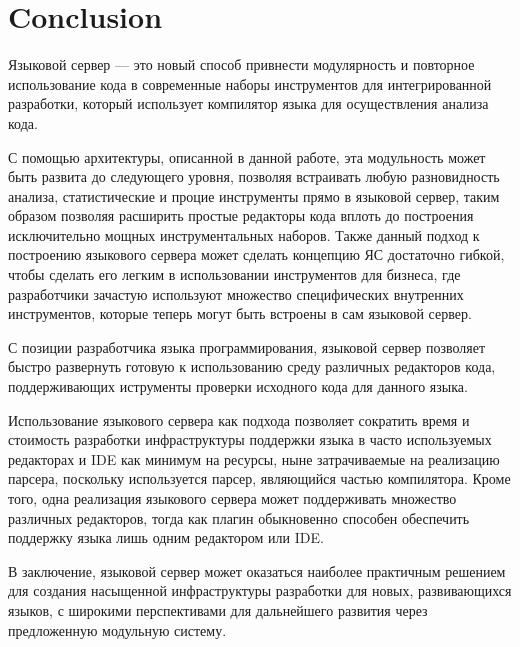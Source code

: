 \chapter{Conclusion}
\label{chap:conclusion}

Языковой сервер --- это новый способ привнести модулярность и повторное использование кода в современные наборы инструментов для интегрированной разработки, который использует компилятор языка для осуществления анализа кода.

С помощью архитектуры, описанной в данной работе, эта модульность может быть развита до следующего уровня, позволяя встраивать любую разновидность анализа, статистические и процие инструменты прямо в языковой сервер, таким образом позволяя расширить простые редакторы кода вплоть до построения исключительно мощных инструментальных наборов. Также данный подход к построению языкового сервера может сделать концепцию ЯС достаточно гибкой, чтобы сделать его легким в использовании инструментов для бизнеса, где разработчики зачастую используют множество специфических внутренних инструментов, которые теперь могут быть встроены в сам языковой сервер.

С позиции разработчика языка программирования, языковой сервер позволяет быстро развернуть готовую к использованию среду различных редакторов кода, поддерживающих иструменты проверки исходного кода для данного языка.

Использование языкового сервера как подхода позволяет сократить время и стоимость разработки инфраструктуры поддержки языка в часто используемых редакторах и IDE как минимум на ресурсы, ныне затрачиваемые на реализацию парсера, поскольку используется парсер, являющийся частью компилятора. Кроме того, одна реализация языкового сервера может поддерживать множество различных редакторов, тогда как плагин обыкновенно способен обеспечить поддержку языка лишь одним редактором или IDE.

В заключение, языковой сервер может оказаться наиболее практичным решением для создания насыщенной инфраструктуры разработки для новых, развивающихся языков, с широкими перспективами для дальнейшего развития через предложенную модульную систему.

